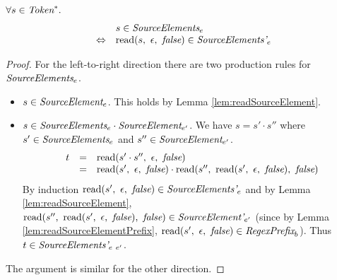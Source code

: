 \documentclass[preprint,10pt]{sigplanconf}
\begin{document}
\begin{lemma}\mbox{}

  \( \forall s \in \textit{Token}^*. \)
  \[
  \begin{array}{rl}
  &s \in \textit{SourceElements}_{e} 
  \\
  \Leftrightarrow&
  \textrm{read}(s,~\epsilon,~\textit{false}) \in \textit{SourceElements'}_{e} 
  \end{array}
  \]
\end{lemma}
\begin{proof}
  For the left-to-right direction there are two production rules for
  \( \textit{SourceElements}_{e} \).
  \begin{itemize}
  \item \( s \in \textit{SourceElement}_{e} \). This holds by Lemma
    \ref{lem:readSourceElement}.
    
  \item \( s \in \textit{SourceElements}_{e} \cdot \textit{SourceElement}_{e'} \).
    We have
    \( s = s' \cdot s'' \) where \( s' \in \textit{SourceElements}_{e}
    \) and \( s'' \in \textit{SourceElement}_{e'} \).
    \[
    \begin{array}{rcl}
      t &=& \textrm{read}(s'\cdot s'',~\epsilon,~\textit{false})
      \\
      &=& \textrm{read}(s',~\epsilon,~\textit{false})\cdot  
      \textrm{read}(s'',~\textrm{read}(s',~\epsilon,~\textit{false}),~\textit{false})
    \end{array}
    \]
    By induction \( \textrm{read}(s',~\epsilon,~\textit{false}) \in
    \textit{SourceElements'}_{e} \) and by Lemma
    \ref{lem:readSourceElement}, \( \textrm{read}(s'',~
      \textrm{read}(s',~\epsilon,~\textit{false}),~\textit{false}) \in \textit{SourceElement'}_{e'} \) (since
    by Lemma \ref{lem:readSourceElementPrefix}, \( 
    \textrm{read}(s',~\epsilon,~\textit{false}) \in \textit{RegexPrefix}_b \)). Thus \( t \in
    \textit{SourceElements'}_{e~e'} \).
  \end{itemize}
  
  The argument is similar for the other direction.
\end{proof}
\end{document}

